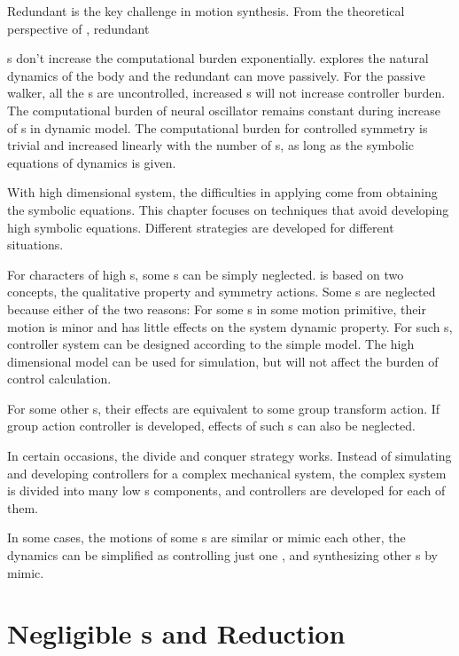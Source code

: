 Redundant {\dof} is the key challenge in motion synthesis.
From the theoretical perspective of \moit, redundant {\dof s don't increase the computational burden exponentially.
\moit explores the natural dynamics of the body and the redundant {\dof} can move passively.
For the passive walker, all the \dof s are uncontrolled, increased {\dof} s will not increase controller burden.
The computational burden of neural oscillator remains constant during increase of {\dof} s in dynamic model.
The computational burden for controlled symmetry is trivial and increased linearly with the number of {\dof} s, as long as the symbolic equations of dynamics is given.

With high dimensional system,  the difficulties in applying \moit  come from  obtaining the symbolic equations.
This chapter focuses on techniques that avoid developing high \dof symbolic equations.
Different strategies are developed for different situations.

\begin{itemize}
For characters of high {\dof}s, some {\dof}s can be simply neglected.
\moit is based on two concepts, the qualitative property and symmetry actions.
Some \dof s are neglected because either of the two reasons:
For some {\dof}s in some motion primitive, their motion is minor and has little effects on the system dynamic property.
For such {\dof}s, controller system can be designed according to the simple model. 
The high dimensional model can be used for simulation, but will not affect the burden of control calculation.

For some other {\dof}s, their effects are equivalent to some group transform action.
If group action controller is developed, effects of such {\dof}s can also be neglected.

In certain occasions, the divide and conquer strategy works.
Instead of simulating and developing controllers for a complex mechanical system, the complex system is divided into many  low {\dof}s components, and controllers are developed for each of them.

In some cases, the motions of some {\dof}s are similar or mimic each other, the dynamics can be simplified as controlling just one {\dof}, and synthesizing other {\dof}s by mimic.
\end{itemize} 

\section{Negligible {\dof}s and Reduction}
}
